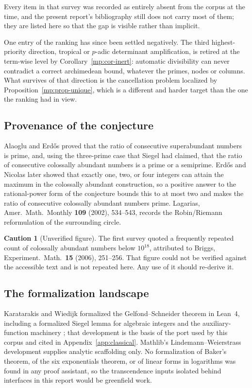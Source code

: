 \documentclass[11pt,oneside]{article}
\theoremstyle{definition}
\newtheorem{warning}[theorem]{Caution}
\theoremstyle{remark}
\begin{document}
Every item in that survey was recorded as entirely absent from the corpus at the time, and the
present report's bibliography still does not carry most of them; they are listed here so that
the gap is visible rather than implicit.

One entry of the ranking has since been settled negatively.  The third highest-priority
direction, tropical or $p$-adic determinant amplification, is retired at the term-wise level by
Corollary~\ref{mp:cor-inert}: automatic divisibility can never contradict a correct archimedean
bound, whatever the primes, nodes or columns.  What survives of that direction is the
cancellation problem localized by Proposition~\ref{mp:prop-unique}, which is a different and
harder target than the one the ranking had in view.

\subsection{Provenance of the conjecture}

Alaoglu and Erd\H{o}s proved that the ratio of consecutive superabundant numbers is prime, and,
using the three-prime case that Siegel had claimed, that the ratio of consecutive colossally
abundant numbers is a prime or a semiprime.  Erd\H{o}s and Nicolas later showed that exactly
one, two, or four integers can attain the maximum in the colossally abundant construction, so a
positive answer to the rational-power form of the conjecture bounds this to at most two and
makes the ratio of consecutive colossally abundant numbers prime.  Lagarias, Amer.\ Math.\
Monthly \textbf{109} (2002), 534--543, records the Robin/Riemann reformulation of the
surrounding circle.

\begin{warning}[Unverified figure]
The first survey quoted a frequently repeated count of colossally abundant numbers below
$10^{18}$, attributed to Briggs, Experiment.\ Math.\ \textbf{15} (2006), 251--256.  That figure
could not be verified against the accessible text and is not repeated here.  Any use of it
should re-derive it.
\end{warning}

\subsection{The formalization landscape}

Karatarakis and Wiedijk formalized the Gelfond--Schneider theorem in Lean~4, including a
formalized Siegel lemma for algebraic integers and the auxiliary-function machinery
\cite{KaratarakisWiedijk2026}; that development is the basis of the port used by this corpus
and cited in Appendix~\ref{app:classical}.  Mathlib's Lindemann--Weierstrass development supplies analytic
scaffolding only.  No formalization of Baker's theorem, of the six exponentials theorem, or of
linear forms in logarithms was found in any proof assistant, so the transcendence inputs
isolated behind interfaces in this report would be greenfield work.
\end{document}
